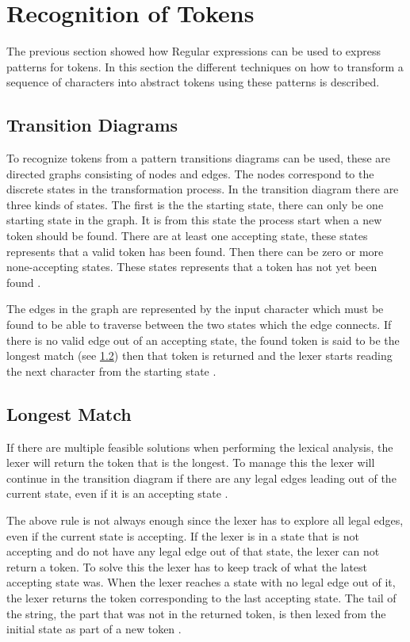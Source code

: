 \section{Recognition of Tokens}
The previous section showed how Regular expressions can be used
to express patterns for tokens. In this section the different techniques on how
to transform a sequence of characters into abstract tokens using these patterns
is described.

\subsection{Transition Diagrams}
To recognize tokens from a pattern transitions diagrams can be used, these are
directed graphs consisting of nodes and edges. The nodes correspond to the
discrete states in the transformation process. In the transition diagram there
are three kinds of states. The first is the the starting state, there can only
be one starting state in the graph. It is from this state the process start when
a new token should be found. There are at least one accepting state, these states
represents that a valid token has been found. Then there can be zero or more
none-accepting states. These states represents that a token has not yet been
found \cite{Aho2006}.

The edges in the graph are represented by the input character which must be
found to be able to traverse between the two states which the edge connects. If
there is no valid edge out of an accepting state, the found token is said to be
the longest match (see \cref{sub:longmatch}) then that token is returned and the
lexer starts reading the next character from the starting state \cite{Aho2006}.

\subsection{Longest Match}\label{sub:longmatch}
If there are multiple feasible solutions when performing the lexical
analysis, the lexer will return the token that is the longest. To manage this
the lexer will continue in the transition diagram if there are any legal edges
leading out of the current state, even if it is an accepting state \cite{Aho2006}.

The above rule is not always enough since the lexer has to explore all legal
edges, even if the current state is accepting. If the lexer is in a state that
is not accepting and do not have any legal edge out of that state, the lexer
can not return a token. To solve this the lexer has to keep track of what the
latest accepting state was. When the lexer reaches a state with no
legal edge out of it, the lexer returns the token corresponding to the last
accepting state. The tail of the string, the part that was not in the returned
token, is then lexed from the initial state as part of a new token
\cite{Aho2006}.

